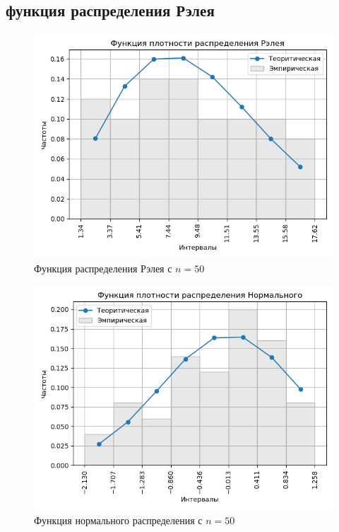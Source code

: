 \documentclass[a4]{article}
\begin{document}
\subsection{функция распределения Рэлея}
\begin{center}

\begin{figure}[H]
\caption{Функция распределения Рэлея с $ n = 50$}
\includegraphics[width=\textwidth]{output/task2/rayleigh_50_histogram.png}
\end{figure}

\begin{figure}[H]
\caption{Функция нормального распределения с $ n = 50$}
\includegraphics[width=\textwidth]{output/task2/norm_50_histogram.png}
\end{figure}


\end{center}
\end{document}
